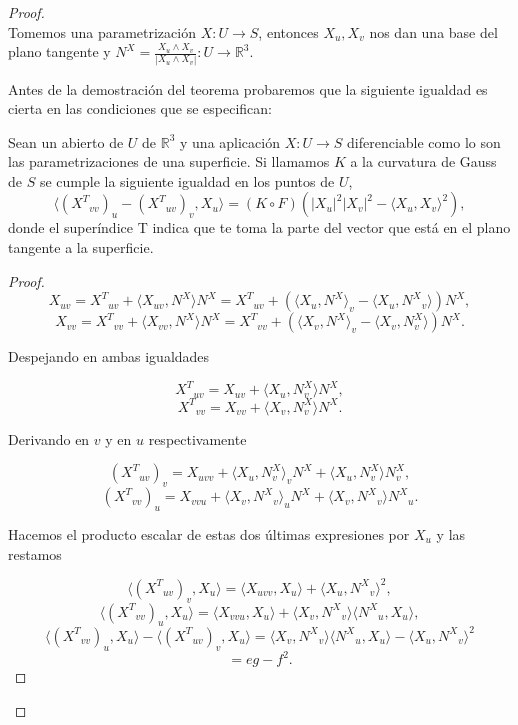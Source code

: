\begin{proof}
	${ }$\\
	Tomemos una parametrización $X : U \to S$, entonces $X_u, X_v$ nos dan una base del plano tangente y $N^X = \frac{X_u \wedge X_v}{|X_u \wedge X_v|} : U \to \mathbb{R}^3$.
	
	Antes de la demostración del teorema probaremos que la siguiente igualdad es cierta en las condiciones que se especifican:
	\begin{lema}
		Sean un abierto de $U$ de $\mathbb{R}^3$ y una aplicación $X : U \to S$ diferenciable como lo son las parametrizaciones de una superficie. Si llamamos $K$ a la curvatura de Gauss de $S$ se cumple la siguiente igualdad en los puntos de $U$,
		\[
			\langle ({X^T}_{vv})_u - ({X^T}_{uv})_v, X_u \rangle = (K \circ F)(|X_u|^2|X_v|^2 - \langle X_u, X_v \rangle ^2),
		\]
		donde el superíndice T indica que te toma la parte del vector que está en el plano tangente a la superficie.
	\end{lema}
	\begin{proof}
		\[
			X_{uv} = {X^T}_{uv} + \langle X_{uv}, N^X \rangle N^X = {X^T}_{uv} + (\langle X_u,N^X \rangle_v - \langle X_u, {N^X}_v \rangle )N^X,
		\]
		\[
			X_{vv} = {X^T}_{vv} + \langle X_{vv}, N^{X} \rangle N^X = {X^T}_{vv} + (\langle X_v,N^X \rangle _v - \langle X_v, N^{X}_{v}\rangle )N^X.
		\]
		
		Despejando en ambas igualdades
		
		\[
			{X^T}_{uv} = X_{uv} + \langle X_u, N^{X}_{v} \rangle N^X,
		\]
		\[
			{X^T}_{vv} = X_{vv} + \langle X_v, N^{X}_{v} \rangle N^X.
		\]
		
		Derivando en $v$ y en $u$ respectivamente
		
		\[
			({X^T}_{uv})_v = X_{uvv} + \langle X_u, N^{X}_{v} \rangle _v N^X + \langle X_u, N^{X}_{v} \rangle N^{X}_{v},
		\]
		\[
			({X^T}_{vv})_u = X_{vvu} + \langle X_v, {N^X}_v\rangle _u N^X + \langle X_v, {N^X}_v \rangle {N^X}_u.
		\]
		
		Hacemos el producto escalar de estas dos últimas expresiones por $X_u$ y las restamos
		
		\[
			\langle ({X^T}_{uv})_v, X_u \rangle = \langle X_{uvv}, X_u \rangle + \langle X_u, {N^X}_v \rangle ^2,
		\]
		\[
			\langle ({X^T}_{vv})_u, X_u \rangle = \langle X_{vvu}, X_u \rangle + \langle X_v, {N^X}_v \rangle \langle {N^X}_u, X_u \rangle ,
		\]
	${ }$\\	
		\[
			\langle ({X^T}_{vv})_u, X_u \rangle - \langle ({X^T}_{uv})_v, X_u \rangle = \langle X_v, {N^X}_v \rangle \langle {N^X}_u, X_u \rangle - \langle X_u, {N^X}_v \rangle ^2
		\]
		\[
			= eg - f^2.
		\]
		

\end{proof}
\end{proof}
